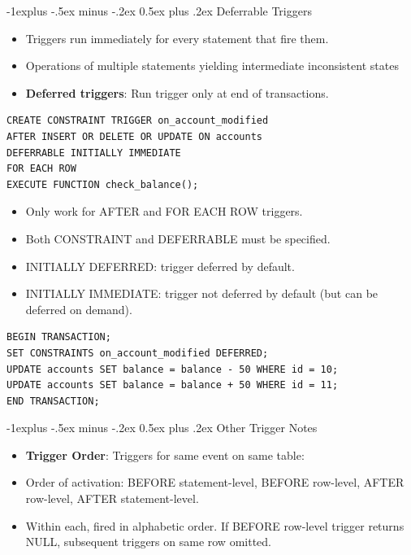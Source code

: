 \documentclass[12pt, landscape]{article}
\makeatletter
\renewcommand{\subsection}{\@startsection{subsection}{2}{0.1mm}%
                                {-1explus -.5ex minus -.2ex}%
                                {0.5ex plus .2ex}%
                                {\normalfont\normalsize\bfseries}}
\makeatother
\begin{document}
\begin{multicols*}{3}
\subsection{Deferrable Triggers}
\begin{itemize}
\item Triggers run immediately for every statement that fire them.
\item Operations of multiple statements yielding intermediate inconsistent states
\item \textbf{Deferred triggers}: Run trigger only at end of transactions.
\end{itemize}

\begin{lstlisting}
CREATE CONSTRAINT TRIGGER on_account_modified
AFTER INSERT OR DELETE OR UPDATE ON accounts
DEFERRABLE INITIALLY IMMEDIATE
FOR EACH ROW
EXECUTE FUNCTION check_balance();
\end{lstlisting}

\begin{itemize}
\item Only work for AFTER and FOR EACH ROW triggers.
\item Both CONSTRAINT and DEFERRABLE must be specified.
\item INITIALLY DEFERRED: trigger deferred by default.
\item INITIALLY IMMEDIATE: trigger not deferred by default (but can be deferred on demand).
\end{itemize}

\columnbreak 

\begin{lstlisting}
BEGIN TRANSACTION;
SET CONSTRAINTS on_account_modified DEFERRED;
UPDATE accounts SET balance = balance - 50 WHERE id = 10;
UPDATE accounts SET balance = balance + 50 WHERE id = 11;
END TRANSACTION;
\end{lstlisting}

\subsection{Other Trigger Notes}
\begin{itemize}
\item \textbf{Trigger Order}: Triggers for same event on same table:
\item Order of activation: BEFORE statement-level, BEFORE row-level, AFTER row-level, AFTER statement-level.
\item Within each, fired in alphabetic order. If BEFORE row-level trigger returns NULL, subsequent triggers on same row omitted.
\end{itemize}



\end{multicols*}
\end{document}
